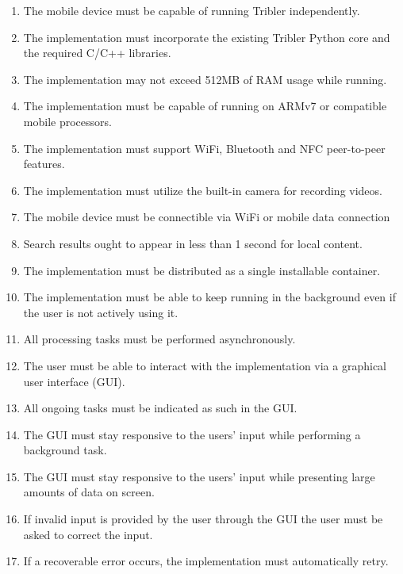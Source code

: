 \begin{enumerate}[label=B\arabic*.,ref=req. B\arabic*]
	
	\item \label{rq1}The mobile device must be capable of running Tribler independently.
	\item The implementation must incorporate the existing Tribler Python core and the required C/C++ libraries.
	\item The implementation may not exceed 512MB of RAM usage while running.
	\item The implementation must be capable of running on ARMv7 or compatible mobile processors.
	\item The implementation must support WiFi, Bluetooth and NFC peer-to-peer features.
	\item The implementation must utilize the built-in camera for recording videos.
	\item The mobile device must be connectible via WiFi or mobile data connection
	\item Search results ought to appear in less than 1 second for local content.
	\item The implementation must be distributed as a single installable container.
	\item The implementation must be able to keep running in the background even if the user is not actively using it.
	\item All processing tasks must be performed asynchronously.
	\item The user must be able to interact with the implementation via a graphical user interface (GUI).
	\item All ongoing tasks must be indicated as such in the GUI.
	\item The GUI must stay responsive to the users' input while performing a background task.
	\item The GUI must stay responsive to the users' input while presenting large amounts of data on screen.
	\item If invalid input is provided by the user through the GUI the user must be asked to correct the input.
	\item If a recoverable error occurs, the implementation must automatically retry.

\end{enumerate}
